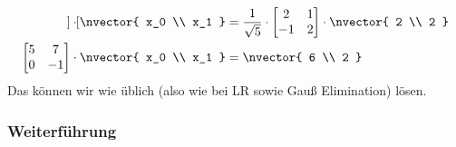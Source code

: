 {\begin{align*}
\begin{bmatrix}
			\end{bmatrix} 
			\cdot
			\nvector{
				x_0 \\ x_1
			}
			&=
			\frac{1}{\sqrt{5}} \cdot
			\begin{bmatrix}
				2 & 1 \\
				-1 & 2
			\end{bmatrix} \cdot 
			\nvector{
				2 \\ 2
			} 
			\\
			\begin{bmatrix}
				5 & 7 \\ 
				0 & -1
			\end{bmatrix} 
			\cdot
			\nvector{
				x_0 \\ x_1
			}
			&=
			\nvector{
				6 \\ 2
			}
		\end{align*}
		Das können wir wie üblich (also wie bei LR sowie Gauß Elimination) lösen.
	}
	 
	 \newpage
	 \subsubsection{Weiterführung}
	 \label{chap:qr3d}
	 
